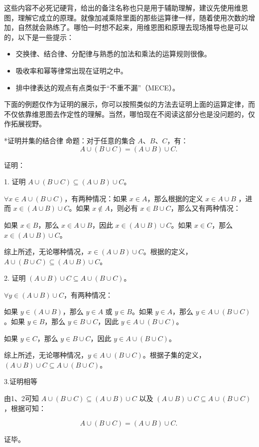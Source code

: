 这些内容不必死记硬背，给出的备注名称也只是用于辅助理解，建议先使用维恩图，理解它成立的原理。就像加减乘除里面的那些运算律一样，随着使用次数的增加，自然就会熟练了。哪怕一时想不起来，用维恩图和原理去现场推导也是可以的，以下是一些提示：
\begin{itemize}
\item 交换律、结合律、分配律与熟悉的加法和乘法的运算规则很像。
\item 吸收率和幂等律常出现在证明之中。
\item 排中律表达的观点有点类似于“不重不漏”（MECE）。
\end{itemize}
下面的例题仅作为证明的展示，你可以按照类似的方法去证明上面的运算定律，而不仅依靠维恩图去作定性的理解。当然，哪怕现在不阅读这部分也是没问题的，仅作拓展视野。
\begin{example}{*证明并集的结合律}
命题：对于任意的集合 $ A $、$ B $、$ C $，有：
$$ A \cup (B \cup C) = (A \cup B) \cup C .~$$

证明：

1. 证明 $A \cup (B \cup C) \subseteq (A \cup B) \cup C $。

$\forall x \in A \cup (B \cup C) $，有两种情况：如果 $ x \in A $，那么根据的定义 $ x \in A \cup B $ ，进而 $ x \in (A \cup B) \cup C $。如果 $ x \notin A $，则必有 $ x \in B \cup C $，那么又有两种情况：

如果 $ x \in B $，那么 $ x \in A \cup B $，因此 $ x \in (A \cup B) \cup C $。如果 $ x \in C $，那么 $ x \in (A \cup B) \cup C $。

综上所述，无论哪种情况，$ x \in (A \cup B) \cup C $。根据的定义，$ A \cup (B \cup C) \subseteq (A \cup B) \cup C $。

2. 证明 $ (A \cup B) \cup C \subseteq A \cup (B \cup C) $。

$\forall y \in (A \cup B) \cup C $，有两种情况：

如果 $ y \in (A \cup B) $，那么 $ y \in A $ 或 $ y \in B $。如果 $ y \in A $，那么 $ y \in A \cup (B \cup C) $。如果 $ y \in B $，那么 $ y \in B \cup C $，因此 $ y \in A \cup (B \cup C) $。

如果 $ y \in C $，那么 $ y \in B \cup C $，因此 $ y \in A \cup (B \cup C) $。

综上所述，无论哪种情况，$ y \in A \cup (B \cup C) $。根据子集的定义，$ (A \cup B) \cup C \subseteq A \cup (B \cup C) $。

3.证明相等

由1、2可知 $ A \cup (B \cup C) \subseteq (A \cup B) \cup C $ 以及 $ (A \cup B) \cup C \subseteq A \cup (B \cup C) $，根据可知：

$$ A \cup (B \cup C) = (A \cup B) \cup C .~$$

证毕。
\end{example}


